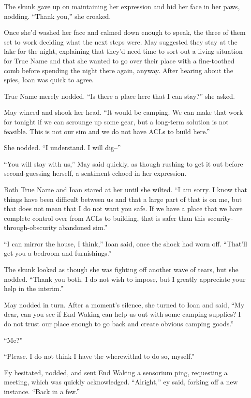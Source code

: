 The skunk gave up on maintaining her expression and hid her face in her paws, nodding. ``Thank you,'' she croaked.

Once she'd washed her face and calmed down enough to speak, the three of them set to work deciding what the next steps were. May suggested they stay at the lake for the night, explaining that they'd need time to sort out a living situation for True Name and that she wanted to go over their place with a fine-toothed comb before spending the night there again, anyway. After hearing about the spies, Ioan was quick to agree.

True Name merely nodded. ``Is there a place here that I can stay?'' she asked.

May winced and shook her head. ``It would be camping. We can make that work for tonight if we can scrounge up some gear, but a long-term solution is not feasible. This is not our sim and we do not have ACLs to build here.''

She nodded. ``I understand. I will dig--''

``You will stay with us,'' May said quickly, as though rushing to get it out before second-guessing herself, a sentiment echoed in her expression.

Both True Name and Ioan stared at her until she wilted. ``I am sorry. I know that things have been difficult between us and that a large part of that is on me, but that does not mean that I do not want you safe. If we have a place that we have complete control over from ACLs to building, that is safer than this security-through-obscurity abandoned sim.''

``I can mirror the house, I think,'' Ioan said, once the shock had worn off. ``That'll get you a bedroom and furnishings.''

The skunk looked as though she was fighting off another wave of tears, but she nodded. ``Thank you both. I do not wish to impose, but I greatly appreciate your help in the interim.''

May nodded in turn. After a moment's silence, she turned to Ioan and said, ``My dear, can you see if End Waking can help us out with some camping supplies? I do not trust our place enough to go back and create obvious camping goods.''

``Me?''

``Please. I do not think I have the wherewithal to do so, myself.''

Ey hesitated, nodded, and sent End Waking a sensorium ping, requesting a meeting, which was quickly acknowledged. ``Alright,'' ey said, forking off a new instance. ``Back in a few.''

